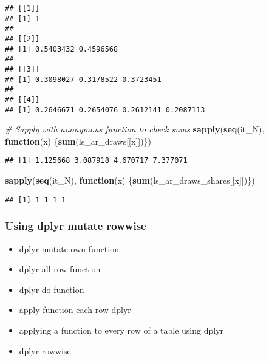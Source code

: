 \documentclass[
]{book}
\newenvironment{Shaded}{\begin{snugshade}}{\end{snugshade}}
\newcommand{\CommentTok}[1]{\textcolor[rgb]{0.56,0.35,0.01}{\textit{#1}}}
\newcommand{\ControlFlowTok}[1]{\textcolor[rgb]{0.13,0.29,0.53}{\textbf{#1}}}
\newcommand{\KeywordTok}[1]{\textcolor[rgb]{0.13,0.29,0.53}{\textbf{#1}}}
\newcommand{\NormalTok}[1]{#1}
\newcommand{\OperatorTok}[1]{\textcolor[rgb]{0.81,0.36,0.00}{\textbf{#1}}}
\newcommand{\StringTok}[1]{\textcolor[rgb]{0.31,0.60,0.02}{#1}}
\providecommand{\tightlist}{%
  \setlength{\itemsep}{0pt}\setlength{\parskip}{0pt}}
\begin{document}
\begin{verbatim}
## [[1]]
## [1] 1
## 
## [[2]]
## [1] 0.5403432 0.4596568
## 
## [[3]]
## [1] 0.3098027 0.3178522 0.3723451
## 
## [[4]]
## [1] 0.2646671 0.2654076 0.2612141 0.2087113
\end{verbatim}

\begin{Shaded}
\begin{Highlighting}[]
\CommentTok{# Sapply with anonymous function to check sums}
\KeywordTok{sapply}\NormalTok{(}\KeywordTok{seq}\NormalTok{(it_N), }\ControlFlowTok{function}\NormalTok{(x) \{}\KeywordTok{sum}\NormalTok{(ls_ar_draws[[x]])\})}
\end{Highlighting}
\end{Shaded}

\begin{verbatim}
## [1] 1.125668 3.087918 4.670717 7.377071
\end{verbatim}

\begin{Shaded}
\begin{Highlighting}[]
\KeywordTok{sapply}\NormalTok{(}\KeywordTok{seq}\NormalTok{(it_N), }\ControlFlowTok{function}\NormalTok{(x) \{}\KeywordTok{sum}\NormalTok{(ls_ar_draws_shares[[x]])\})}
\end{Highlighting}
\end{Shaded}

\begin{verbatim}
## [1] 1 1 1 1
\end{verbatim}

\hypertarget{using-dplyr-mutate-rowwise}{%
\subsubsection{Using dplyr mutate rowwise}\label{using-dplyr-mutate-rowwise}}

\begin{itemize}
\tightlist
\item
  dplyr mutate own function
\item
  dplyr all row function
\item
  dplyr do function
\item
  apply function each row dplyr
\item
  applying a function to every row of a table using dplyr
\item
  dplyr rowwise
\end{itemize}

\begin{Shaded}
\end{Shaded}
\end{document}
